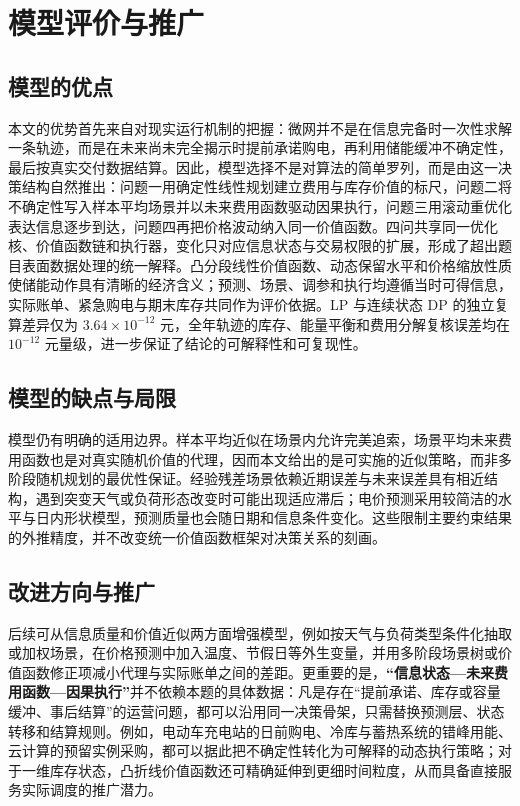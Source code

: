 \section{模型评价与推广}
\subsection{模型的优点}
本文的优势首先来自对现实运行机制的把握：微网并不是在信息完备时一次性求解一条轨迹，而是在未来尚未完全揭示时提前承诺购电，再利用储能缓冲不确定性，最后按真实交付数据结算。因此，模型选择不是对算法的简单罗列，而是由这一决策结构自然推出：问题一用确定性线性规划建立费用与库存价值的标尺，问题二将不确定性写入样本平均场景并以未来费用函数驱动因果执行，问题三用滚动重优化表达信息逐步到达，问题四再把价格波动纳入同一价值函数。四问共享同一优化核、价值函数链和执行器，变化只对应信息状态与交易权限的扩展，形成了超出题目表面数据处理的统一解释。凸分段线性价值函数、动态保留水平和价格缩放性质使储能动作具有清晰的经济含义；预测、场景、调参和执行均遵循当时可得信息，实际账单、紧急购电与期末库存共同作为评价依据。LP 与连续状态 DP 的独立复算差异仅为 $3.64\times10^{-12}$ 元，全年轨迹的库存、能量平衡和费用分解复核误差均在 $10^{-12}$ 元量级，进一步保证了结论的可解释性和可复现性。

\subsection{模型的缺点与局限}
模型仍有明确的适用边界。样本平均近似在场景内允许完美追索，场景平均未来费用函数也是对真实随机价值的代理，因而本文给出的是可实施的近似策略，而非多阶段随机规划的最优性保证。经验残差场景依赖近期误差与未来误差具有相近结构，遇到突变天气或负荷形态改变时可能出现适应滞后；电价预测采用较简洁的水平与日内形状模型，预测质量也会随日期和信息条件变化。这些限制主要约束结果的外推精度，并不改变统一价值函数框架对决策关系的刻画。

\subsection{改进方向与推广}
后续可从信息质量和价值近似两方面增强模型，例如按天气与负荷类型条件化抽取或加权场景，在价格预测中加入温度、节假日等外生变量，并用多阶段场景树或价值函数修正项减小代理与实际账单之间的差距。更重要的是，\textbf{“信息状态—未来费用函数—因果执行”}并不依赖本题的具体数据：凡是存在“提前承诺、库存或容量缓冲、事后结算”的运营问题，都可以沿用同一决策骨架，只需替换预测层、状态转移和结算规则。例如，电动车充电站的日前购电、冷库与蓄热系统的错峰用能、云计算的预留实例采购，都可以据此把不确定性转化为可解释的动态执行策略；对于一维库存状态，凸折线价值函数还可精确延伸到更细时间粒度，从而具备直接服务实际调度的推广潜力。
